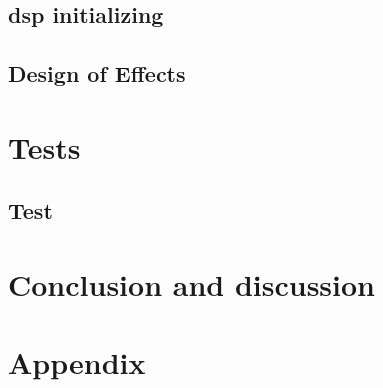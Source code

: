 \chapter{\gls{dsp} initializing}

\chapter{Design of Effects}



%

 \graphicspath{{figures/tests/}}
\part{Tests}\label{pt:tests}
\chapter{Test}








 
\part{Conclusion and discussion}\label{pt:conclusions}
 
%

\glsresetall
\appendix %

 \graphicspath{{figures/appendix/}}
\part{Appendix}\label{pt:appendix}










